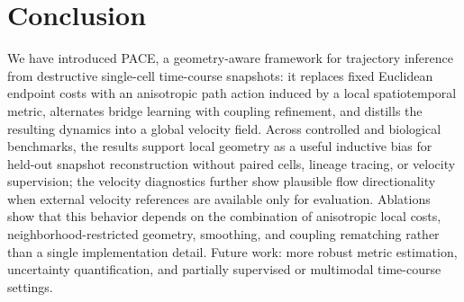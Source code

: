 \section{Conclusion}
We have introduced PACE, a geometry-aware framework for trajectory inference from destructive single-cell time-course snapshots: it replaces fixed Euclidean endpoint costs with an anisotropic path action induced by a local spatiotemporal metric, alternates bridge learning with coupling refinement, and distills the resulting dynamics into a global velocity field.
Across controlled and biological benchmarks, the results support local geometry as a useful inductive bias for held-out snapshot reconstruction without paired cells, lineage tracing, or velocity supervision; %
the velocity diagnostics further show plausible flow directionality when external velocity references are available only for evaluation.
Ablations show that this behavior depends on the combination of anisotropic local costs, neighborhood-restricted geometry, smoothing, and coupling rematching rather than a single implementation detail.
Future work: more robust metric estimation, uncertainty quantification, and partially supervised or multimodal time-course settings.
